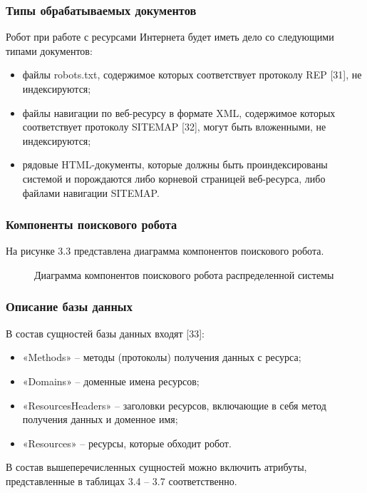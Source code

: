 \subsubsection{Типы обрабатываемых документов}
Робот при работе с ресурсами Интернета будет иметь дело со следующими типами документов:
\begin{itemize}
\item файлы robots.txt, содержимое которых соответствует протоколу REP [31], не индексируются;
\item файлы навигации по веб-ресурсу в формате XML, содержимое которых соответствует протоколу SITEMAP [32], могут быть вложенными, не индексируются;
\item рядовые HTML-документы, которые должны быть проиндексированы системой и порождаются либо корневой страницей веб-ресурса, либо файлами навигации SITEMAP.
\end{itemize}

\subsubsection{Компоненты поискового робота}

На рисунке 3.3 представлена диаграмма компонентов поискового робота.

\begin{figure}[H]
\caption{Диаграмма компонентов поискового робота распределенной системы}
\label{robot/diagram_components:image}
\end{figure}

\subsubsection{Описание базы данных}

В состав сущностей базы данных входят [33]:
\begin{itemize}
\item «Methods» -- методы (протоколы) получения данных с ресурса;
\item «Domains» -- доменные имена ресурсов;
\item «ResourcesHeaders» -- заголовки ресурсов, включающие в себя метод получения данных и доменное имя;
\item «Resources» -- ресурсы, которые обходит робот.
\end{itemize}

В состав вышеперечисленных сущностей можно включить атрибуты, представленные в таблицах 3.4 – 3.7 соответственно.

